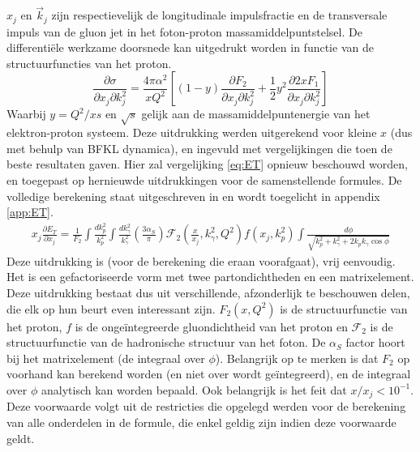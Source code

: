 \documentclass[a4paper,11pt]{article}
\numberwithin{equation}{section} %
\begin{document}
$x_j$  en $\vec{k}_j$ zijn respectievelijk de longitudinale impulsfractie en de transversale impuls van de gluon jet in het foton-proton massamiddelpuntstelsel.
De differentiële werkzame doorsnede kan uitgedrukt worden in functie van de structuurfuncties van het proton.
\begin{equation} \label{eq:SigmaInStructureFunctions}
\frac{\partial \sigma}{\partial x_j \partial k_j^2} = \frac{4 \pi \alpha^2}{xQ^2} \left[ (1-y) \frac{\partial F_2}{\partial x_j \partial k_j^2} + \frac{1}{2} y^2 \frac{\partial 2xF_1}{\partial x_j \partial k_j^2} \right]
\end{equation}
Waarbij $y=Q^2/xs$ en $\sqrt{s}$ gelijk aan de massamiddelpuntenergie van het elektron-proton systeem.
Deze uitdrukking werden uitgerekend voor kleine $x$ (dus met behulp van BFKL dynamica), en ingevuld met vergelijkingen die toen de beste resultaten gaven.
Hier zal vergelijking  \eqref{eq:ET} opnieuw beschouwd worden, en toegepast op hernieuwde uitdrukkingen voor de samenstellende formules.
De volledige berekening staat uitgeschreven in \cite{ET} en wordt toegelicht in appendix \ref{app:ET}.
\begin{align} \label{eq:ET}
x_j \frac{\partial E_T}{\partial x_j} = \frac{1}{F_2} \int \frac{dk_p^2}{k_p^2} \int \frac{dk_\gamma^2}{k_\gamma^2} \left( \frac{3\alpha_S}{\pi} \right) \mathcal{F}_2 \left( \frac{x}{x_j}, k_\gamma^2, Q^2 \right) f(x_j,k_p^2) \int \frac{d\phi}{\sqrt{k_p^2+k_\gamma^2 + 2k_p k_\gamma \cos{\phi}}}
\end{align}
Deze uitdrukking is (voor de berekening die eraan voorafgaat), vrij eenvoudig.
Het is een gefactoriseerde vorm met twee partondichtheden en een matrixelement.
Deze uitdrukking bestaat dus uit verschillende, afzonderlijk te beschouwen delen, die elk op hun beurt even interessant zijn.
$F_2 (x, Q^2)$ is de structuurfunctie van het proton, $f$ is de ongeïntegreerde gluondichtheid van het proton en $\mathcal{F}_2$ is de structuurfunctie van de hadronische structuur van het foton.
De $\alpha_S$ factor hoort bij het matrixelement (de integraal over $\phi$).
Belangrijk op te merken is dat $F_2$ op voorhand kan berekend worden (en niet over wordt geïntegreerd), en de integraal over $\phi$ analytisch kan worden bepaald.
Ook belangrijk is het feit dat $x/x_j < 10^{-1}$.
Deze voorwaarde volgt uit de restricties die opgelegd werden voor de berekening van alle onderdelen in de formule, die enkel geldig zijn indien deze voorwaarde geldt.
 
\end{document}
